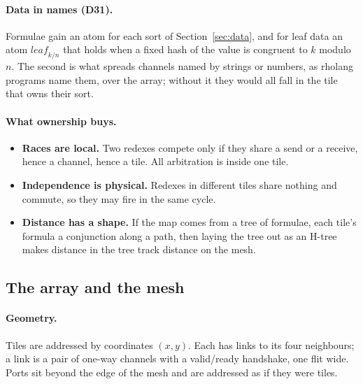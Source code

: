 \documentclass[11pt]{article}
\newcommand{\dec}[1]{\textbf{D#1}}
\theoremstyle{definition}
\theoremstyle{remark}
\begin{document}
\paragraph{Data in names (\dec{31}).} Formulae gain an atom for each sort of
Section~\ref{sec:data}, and for leaf data an atom $\mathit{leaf}_{k/n}$ that
holds when a fixed hash of the value is congruent to $k$ modulo $n$. The
second is what spreads channels named by strings or numbers, as rholang
programs name them, over the array; without it they would all fall in the
tile that owns their sort.

\paragraph{What ownership buys.}
\begin{itemize}
\item \textbf{Races are local.} Two redexes compete only if they share a send
or a receive, hence a channel, hence a tile. All arbitration is inside one
tile.
\item \textbf{Independence is physical.} Redexes in different tiles share
nothing and commute, so they may fire in the same cycle.
\item \textbf{Distance has a shape.} If the map comes from a tree of formulae,
each tile's formula a conjunction along a path, then laying the tree out as
an H-tree makes distance in the tree track distance on the mesh.
\end{itemize}

\subsection{The array and the mesh}\label{sec:mesh}

\paragraph{Geometry.} Tiles are addressed by coordinates $(x,y)$. Each has
links to its four neighbours; a link is a pair of one-way channels with a
valid/ready handshake, one flit wide. Ports sit beyond the edge of the mesh
and are addressed as if they were tiles.
\end{document}
